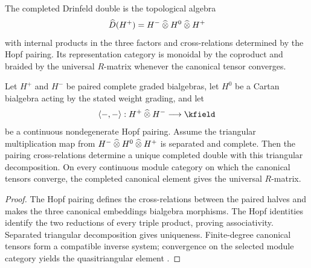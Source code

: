 \begin{definition}
The completed Drinfeld double is the topological algebra
\[
 \widehat D(H^+)=H^-\mathbin{\widehat\otimes} H^0\mathbin{\widehat\otimes} H^+
\]
with internal products in the three factors and cross-relations determined by the Hopf pairing. Its representation category is monoidal by the coproduct and braided by the universal $R$-matrix whenever the canonical tensor converges.
\end{definition}

\begin{theorem}
Let $H^+$ and $H^-$ be paired complete graded bialgebras, let $H^0$ be a Cartan bialgebra acting by the stated weight grading, and let
\[
 \angles{-,-}:H^+\widehattensor H^-\longrightarrow\kfield
\]
be a continuous nondegenerate Hopf pairing. Assume the triangular multiplication map from $H^-\mathbin{\widehat\otimes} H^0\mathbin{\widehat\otimes} H^+$ is separated and complete. Then the pairing cross-relations determine a unique completed double with this triangular decomposition. On every continuous module category on which the canonical tensors converge, the completed canonical element gives the universal $R$-matrix.
\end{theorem}
\begin{proof}
The Hopf pairing defines the cross-relations between the paired halves and makes the three canonical embeddings bialgebra morphisms. The Hopf identities identify the two reductions of every triple product, proving associativity. Separated triangular decomposition gives uniqueness. Finite-degree canonical tensors form a compatible inverse system; convergence on the selected module category yields the quasitriangular element \cite{DrinfeldDouble,EtingofSchiffmann}.
\end{proof}

